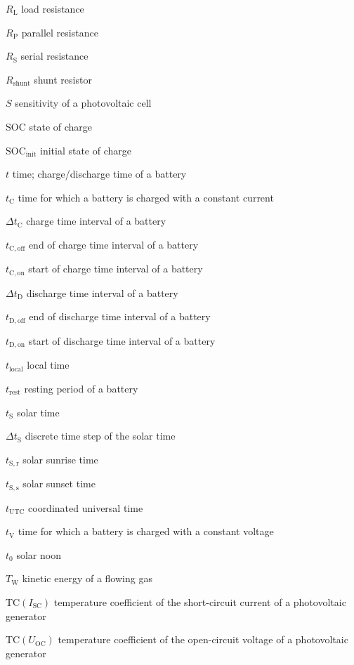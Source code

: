 \begin{symb}
\item[$R_\mathrm{L}$]					load resistance
\item[$R_\mathrm{P}$]					parallel resistance
\item[$R_\mathrm{S}$]					serial resistance
\item[$R_\mathrm{shunt}$]				shunt resistor
\item[$S$]								sensitivity of a photovoltaic cell
\item[$\mathrm{SOC}$]					state of charge
\item[$\mathrm{SOC_{init}}$]			initial state of charge
\item[$t$]								time; charge/discharge time of a battery
\item[$t_\mathrm{C}$]					time for which a battery is charged with a constant current	
\item[$\Delta t_\mathrm{C}$]			charge time interval of a battery
\item[$t_\mathrm{C,off}$]				end of charge time interval of a battery
\item[$t_\mathrm{C,on}$]				start of charge time interval of a battery
\item[$\Delta t_\mathrm{D}$]			discharge time interval of a battery
\item[$t_\mathrm{D,off}$]				end of discharge time interval of a battery
\item[$t_\mathrm{D,on}$]				start of discharge time interval of a battery
\item[$t_\mathrm{local}$]				local time
\item[$t_\mathrm{rest}$]				resting period of a battery
\item[$t_\mathrm{S}$]					solar time
\item[$\Delta t_\mathrm{S}$]			discrete time step of the solar time
\item[$t_\mathrm{S,r}$]					solar sunrise time
\item[$t_\mathrm{S,s}$]					solar sunset time
\item[$t_\mathrm{UTC}$]					coordinated universal time
\item[$t_\mathrm{V}$]					time for which a battery is charged with a constant voltage
\item[$t_0$]							solar noon
\item[$T_\mathrm{W}$]					kinetic energy of a flowing gas
\item[$\mathrm{TC}(I_\mathrm{SC})$]		temperature coefficient of the short-circuit current of a photovoltaic generator
\item[$\mathrm{TC}(U_\mathrm{OC})$]		temperature coefficient of the open-circuit voltage of a photovoltaic generator

\end{symb}
